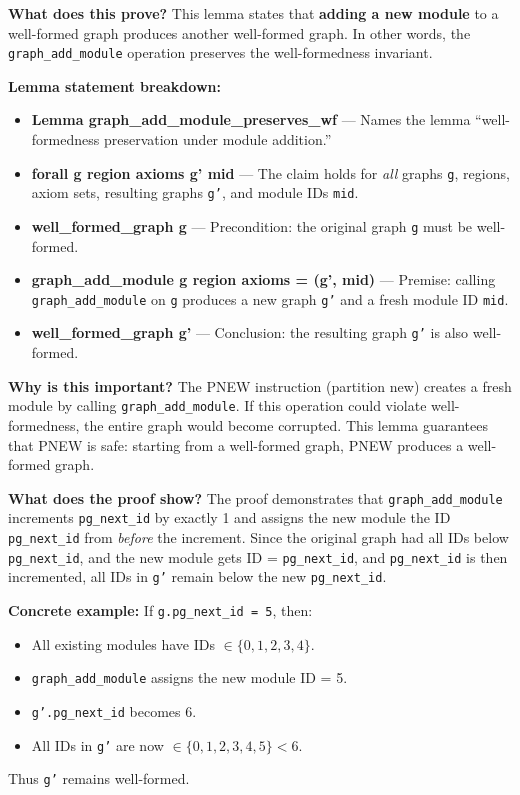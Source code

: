 \textbf{What does this prove?} This lemma states that \textbf{adding a new module} to a well-formed graph produces another well-formed graph. In other words, the \texttt{graph\_add\_module} operation preserves the well-formedness invariant.

\textbf{Lemma statement breakdown:}
\begin{itemize}
    \item \textbf{Lemma graph\_add\_module\_preserves\_wf} — Names the lemma ``well-formedness preservation under module addition.''
    \item \textbf{forall g region axioms g' mid} — The claim holds for \textit{all} graphs \texttt{g}, regions, axiom sets, resulting graphs \texttt{g'}, and module IDs \texttt{mid}.
    \item \textbf{well\_formed\_graph g} — Precondition: the original graph \texttt{g} must be well-formed.
    \item \textbf{graph\_add\_module g region axioms = (g', mid)} — Premise: calling \texttt{graph\_add\_module} on \texttt{g} produces a new graph \texttt{g'} and a fresh module ID \texttt{mid}.
    \item \textbf{well\_formed\_graph g'} — Conclusion: the resulting graph \texttt{g'} is also well-formed.
\end{itemize}

\textbf{Why is this important?} The PNEW instruction (partition new) creates a fresh module by calling \texttt{graph\_add\_module}. If this operation could violate well-formedness, the entire graph would become corrupted. This lemma guarantees that PNEW is safe: starting from a well-formed graph, PNEW produces a well-formed graph.

\textbf{What does the proof show?} The proof demonstrates that \texttt{graph\_add\_module} increments \texttt{pg\_next\_id} by exactly 1 and assigns the new module the ID \texttt{pg\_next\_id} from \textit{before} the increment. Since the original graph had all IDs below \texttt{pg\_next\_id}, and the new module gets ID = \texttt{pg\_next\_id}, and \texttt{pg\_next\_id} is then incremented, all IDs in \texttt{g'} remain below the new \texttt{pg\_next\_id}.

\textbf{Concrete example:} If \texttt{g.pg\_next\_id = 5}, then:
\begin{itemize}
    \item All existing modules have IDs $\in \{0, 1, 2, 3, 4\}$.
    \item \texttt{graph\_add\_module} assigns the new module ID = 5.
    \item \texttt{g'.pg\_next\_id} becomes 6.
    \item All IDs in \texttt{g'} are now $\in \{0, 1, 2, 3, 4, 5\} < 6$.
\end{itemize}
Thus \texttt{g'} remains well-formed.


